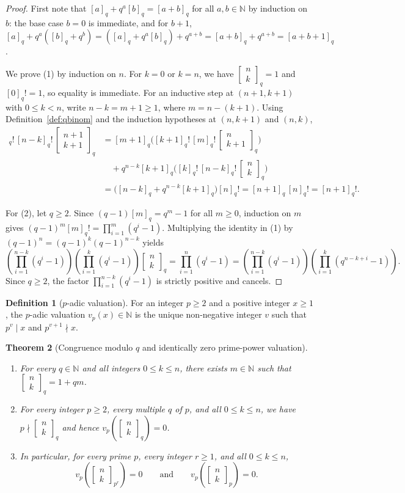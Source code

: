 \documentclass[11pt,a4paper]{article}
\newtheorem{theorem}{Theorem}[section]
\theoremstyle{definition}
\newtheorem{definition}[theorem]{Definition}
\theoremstyle{remark}
\newcommand{\qbinom}[3]{\begin{bmatrix} #1 \\ #2 \end{bmatrix}_{#3}}
\begin{document}
\begin{proof}
First note that $[a]_q + q^a [b]_q = [a+b]_q$ for all $a,b \in \mathbb{N}$ by
induction on $b$: the base case $b=0$ is immediate, and for $b+1$,
$[a]_q + q^a([b]_q + q^b) = ([a]_q + q^a[b]_q) + q^{a+b} = [a+b]_q + q^{a+b}
= [a+b+1]_q$.

We prove (1) by induction on $n$. For $k = 0$ or $k = n$, we have
$\qbinom{n}{k}{q} = 1$ and $[0]_q! = 1$, so equality is immediate. For an inductive
step at $(n+1, k+1)$ with $0 \le k < n$, write $n - k = m + 1 \ge 1$, where
$m = n - (k+1)$. Using Definition~\ref{def:qbinom} and the induction hypotheses at
$(n, k+1)$ and $(n, k)$,
\begin{align*}
  [k+1]_q!\,[n-k]_q!\,\qbinom{n+1}{k+1}{q}
  &= [m+1]_q \bigl([k+1]_q!\,[m]_q!\,\qbinom{n}{k+1}{q}\bigr) \\
  &\quad + q^{n-k}[k+1]_q \bigl([k]_q!\,[n-k]_q!\,\qbinom{n}{k}{q}\bigr) \\
  &= \bigl([n-k]_q + q^{n-k}[k+1]_q\bigr)[n]_q!
   = [n+1]_q\,[n]_q! = [n+1]_q!.
\end{align*}

For (2), let $q \ge 2$. Since $(q-1)[m]_q = q^m - 1$ for all $m \ge 0$, induction
on $m$ gives $(q-1)^m [m]_q! = \prod_{i=1}^{m} (q^i - 1)$. Multiplying the identity
in (1) by $(q-1)^n = (q-1)^k (q-1)^{n-k}$ yields
\[
  \left(\prod_{i=1}^{n-k} (q^i - 1)\right)
  \left(\prod_{i=1}^{k} (q^i - 1)\right) \qbinom{n}{k}{q}
  = \prod_{i=1}^{n} (q^i - 1)
  = \left(\prod_{i=1}^{n-k} (q^i - 1)\right)
    \left(\prod_{i=1}^{k} (q^{n-k+i} - 1)\right).
\]
Since $q \ge 2$, the factor $\prod_{i=1}^{n-k}(q^i - 1)$ is strictly positive and
cancels.
\end{proof}

\begin{definition}[$p$-adic valuation]
For an integer $p \ge 2$ and a positive integer $x \ge 1$, the $p$-adic valuation
$v_p(x) \in \mathbb{N}$ is the unique non-negative integer $v$ such that
$p^v \mid x$ and $p^{v+1} \nmid x$.
\end{definition}

\begin{theorem}[Congruence modulo $q$ and identically zero prime-power valuation]
\label{thm:vanishing}
\leavevmode
\begin{enumerate}
  \item For every $q \in \mathbb{N}$ and all integers $0 \le k \le n$, there exists
    $m \in \mathbb{N}$ such that $\qbinom{n}{k}{q} = 1 + q m$.
  \item For every integer $p \ge 2$, every multiple $q$ of $p$, and all
    $0 \le k \le n$, we have $p \nmid \qbinom{n}{k}{q}$ and hence
    $v_p\!\left(\qbinom{n}{k}{q}\right) = 0$.
  \item In particular, for every prime $p$, every integer $r \ge 1$, and all
    $0 \le k \le n$,
    \[
      v_p\!\left(\qbinom{n}{k}{p^r}\right) = 0
      \qquad\text{and}\qquad
      v_p\!\left(\qbinom{n}{k}{p}\right) = 0.
    \]
\end{enumerate}
\end{theorem}
\end{document}
